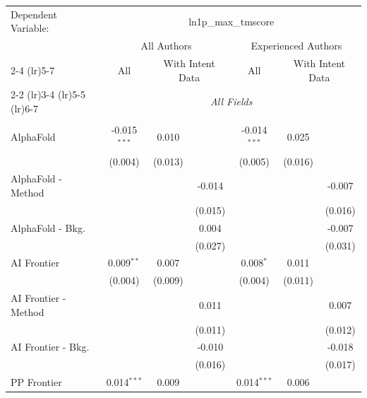 \begingroup
\centering
\begin{tabular}{lcccccc}
   \tabularnewline \midrule \midrule
   Dependent Variable: & \multicolumn{6}{c}{ln1p\_max\_tmscore}\\
 & \multicolumn{3}{c}{All Authors} & \multicolumn{3}{c}{Experienced Authors} \\
\cmidrule(lr){2-4} \cmidrule(lr){5-7}
 & \multicolumn{1}{c}{All} & \multicolumn{2}{c}{With Intent Data} & \multicolumn{1}{c}{All} & \multicolumn{2}{c}{With Intent Data} \\
\cmidrule(lr){2-2} \cmidrule(lr){3-4} \cmidrule(lr){5-5} \cmidrule(lr){6-7}
 & \multicolumn{6}{c}{\textit{All Fields}} \\ \\
   AlphaFold            & -0.015$^{***}$ & 0.010         &         & -0.014$^{***}$ & 0.025        &   \\   
                        & (0.004)        & (0.013)       &         & (0.005)        & (0.016)      &   \\   
   AlphaFold - Method   &                &               & -0.014  &                &              & -0.007\\   
                        &                &               & (0.015) &                &              & (0.016)\\   
   AlphaFold - Bkg.     &                &               & 0.004   &                &              & -0.007\\   
                        &                &               & (0.027) &                &              & (0.031)\\   
   AI Frontier          & 0.009$^{**}$   & 0.007         &         & 0.008$^{*}$    & 0.011        &   \\   
                        & (0.004)        & (0.009)       &         & (0.004)        & (0.011)      &   \\   
   AI Frontier - Method &                &               & 0.011   &                &              & 0.007\\   
                        &                &               & (0.011) &                &              & (0.012)\\   
   AI Frontier - Bkg.   &                &               & -0.010  &                &              & -0.018\\   
                        &                &               & (0.016) &                &              & (0.017)\\   
   PP Frontier          & 0.014$^{***}$  & 0.009         &         & 0.014$^{***}$  & 0.006        &   \\   

\end{tabular}
